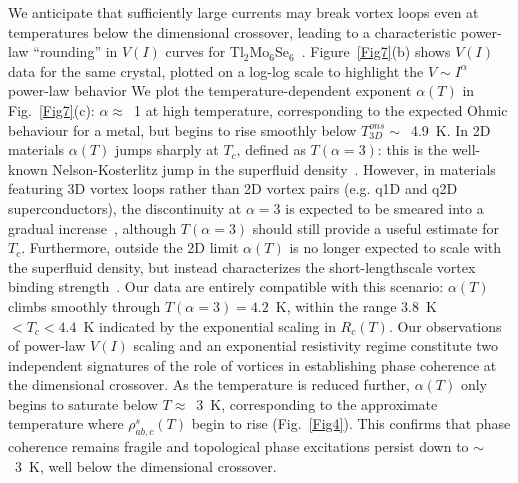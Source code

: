 \documentclass[prb,twocolumn,showpacs,preprintnumbers,amsmath,amssymb,floatfix,groupedaddress,superscriptaddress,aps,10pt]{revtex4-1}
\newcommand{\Tl}{Tl$_2$Mo$_6$Se$_6$}
\begin{document}
{We anticipate that sufficiently large currents may break vortex loops even at temperatures below the dimensional crossover, leading to a characteristic power-law ``rounding'' in $V(I)$ curves for {\Tl}~\cite{Kadin1983}.  Figure~\ref{Fig7}(b) shows $V(I)$ data for the same crystal, plotted on a log-log scale to highlight the $V \sim I^\alpha$ power-law behavior  We plot the temperature-dependent exponent $\alpha(T)$ in Fig.~\ref{Fig7}(c): $\alpha\approx$~1 at high temperature, corresponding to the expected Ohmic behaviour for a metal, but begins to rise smoothly below $T_{3D}^{ons}\sim$~4.9~K.  In 2D materials $\alpha(T)$ jumps sharply at $T_c$, defined as $T(\alpha=3)$: this is the well-known Nelson-Kosterlitz jump in the superfluid density~\cite{Nelson1977}.  However, in materials featuring 3D vortex loops rather than 2D vortex pairs (e.g. q1D and q2D superconductors), the discontinuity at $\alpha=3$ is expected to be smeared into a gradual increase~\cite{Benfatto2007}, although $T(\alpha=3)$ should still provide a useful estimate for $T_c$.  Furthermore, outside the 2D limit $\alpha(T)$ is no longer expected to scale with the superfluid density, but instead characterizes the short-lengthscale vortex binding strength~\cite{Chattopadhyay1994}.  Our data are entirely compatible with this scenario: $\alpha(T)$ climbs smoothly through $T(\alpha=3)=4.2$~K, within the range 3.8~K~$<T_c<4.4$~K indicated by the exponential scaling in $R_c(T)$. Our observations of power-law $V(I)$ scaling and an exponential resistivity regime constitute two independent signatures of the role of vortices in establishing phase coherence at the dimensional crossover.  As the temperature is reduced further, $\alpha(T)$ only begins to saturate below $T\approx$~3~K, corresponding to the approximate temperature where $\rho^s_{ab,c}(T)$ begin to rise (Fig.~\ref{Fig4}).  This confirms that phase coherence remains fragile and topological phase excitations persist down to $\sim$~3~K, well below the dimensional crossover.    

}
\end{document}
